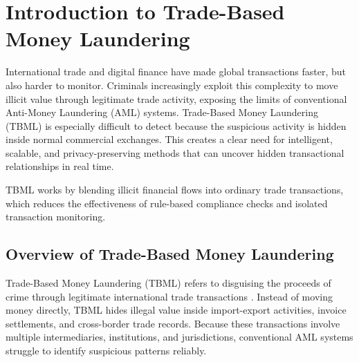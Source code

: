 \chapter{Introduction to Trade-Based Money Laundering}

International trade and digital finance have made global transactions faster, but also harder to monitor. Criminals increasingly exploit this complexity to move illicit value through legitimate trade activity, exposing the limits of conventional Anti-Money Laundering (AML) systems. Trade-Based Money Laundering (TBML) is especially difficult to detect because the suspicious activity is hidden inside normal commercial exchanges. This creates a clear need for intelligent, scalable, and privacy-preserving methods that can uncover hidden transactional relationships in real time.




TBML works by blending illicit financial flows into ordinary trade transactions, which reduces the effectiveness of rule-based compliance checks and isolated transaction monitoring.

\section[Overview of Trade-Based Money Laundering]{\textbf{Overview of Trade-Based Money Laundering}}

Trade-Based Money Laundering (TBML) refers to disguising the proceeds of crime through legitimate international trade transactions \cite{fatf_tbml_2020}. Instead of moving money directly, TBML hides illegal value inside import-export activities, invoice settlements, and cross-border trade records. Because these transactions involve multiple intermediaries, institutions, and jurisdictions, conventional AML systems struggle to identify suspicious patterns reliably.

